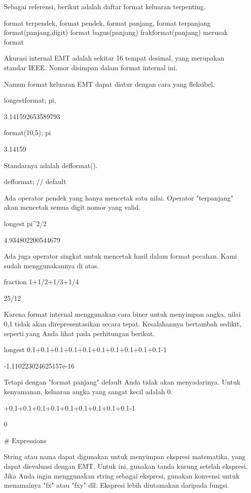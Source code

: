 \documentclass{article}
\begin{document}
Sebagai referensi, berikut adalah daftar format keluaran terpenting.


 format terpendek, format pendek, format panjang, format terpanjang  
 format(panjang,digit) format bagus(panjang)  
 frakformat(panjang)  
 merusak format  

Akurasi internal EMT adalah sekitar 16 tempat desimal, yang merupakan
standar IEEE. Nomor disimpan dalam format internal ini.


Namun format keluaran EMT dapat diatur dengan cara yang fleksibel.


\>longestformat; pi,


    3.141592653589793

\>format(10,5); pi


      3.14159 

Standarnya adalah defformat().


\>defformat; // default


Ada operator pendek yang hanya mencetak satu nilai. Operator
"terpanjang" akan mencetak semua digit nomor yang valid.


\>longest pi^2/2


          4.934802200544679 

Ada juga operator singkat untuk mencetak hasil dalam format pecahan.
Kami sudah menggunakannya di atas.


\>fraction 1+1/2+1/3+1/4


    25/12

Karena format internal menggunakan cara biner untuk menyimpan angka,
nilai 0,1 tidak akan direpresentasikan secara tepat. Kesalahannya
bertambah sedikit, seperti yang Anda lihat pada perhitungan berikut.


\>longest 0.1+0.1+0.1+0.1+0.1+0.1+0.1+0.1+0.1+0.1-1


     -1.110223024625157e-16 

Tetapi dengan "format panjang" default Anda tidak akan menyadarinya.
Untuk kenyamanan, keluaran angka yang sangat kecil adalah 0.


+0.1+0.1+0.1+0.1+0.1+0.1+0.1+0.1+0.1-1


    0

# Expressions

String atau nama dapat digunakan untuk menyimpan ekspresi matematika,
yang dapat dievaluasi dengan EMT. Untuk ini, gunakan tanda kurung
setelah ekspresi. Jika Anda ingin menggunakan string sebagai ekspresi,
gunakan konvensi untuk menamainya "fx" atau "fxy" dll. Ekspresi lebih
diutamakan daripada fungsi.
\end{document}
